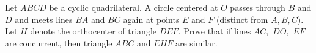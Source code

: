 Let $ABCD$ be a cyclic quadrilateral. A circle centered at $O$ passes through $B$ and $D$ and meets lines $BA$ and $BC$ again at points $E$ and $F$ (distinct from $A,B,C$). Let $H$ denote the orthocenter of triangle $DEF.$ Prove that if lines $AC,$ $DO,$ $EF$ are concurrent, then triangle $ABC$ and $EHF$ are similar.
